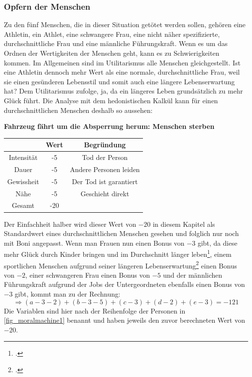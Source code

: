\documentclass[a4paper, 12pt, openany]{book}
\begin{document}
                \subsubsection*{Opfern der Menschen}
                    Zu den fünf Menschen, die in dieser Situation getötet werden sollen, gehören eine Athletin, ein Athlet, eine schwangere Frau, eine nicht näher spezifizierte, durchschnittliche Frau und eine männliche Führungskraft. Wenn es um das Ordnen der Wertigkeiten der Menschen geht, kann es zu Schwierigkeiten kommen. Im Allgemeinen sind im Utilitarismus alle Menschen gleichgestellt. Ist eine Athletin dennoch mehr Wert als eine normale, durchschnittliche Frau, weil sie einen gesünderen Lebensstil und somit auch eine längere Lebenserwartung hat? Dem Utilitarismus zufolge, ja, da ein längeres Leben grundsätzlich zu mehr Glück führt. Die Analyse mit dem hedonistischen Kalkül kann für einen durchschnittlichen Menschen deshalb so aussehen:
                    \begin{center}
                        \textbf{Fahrzeug fährt um die Absperrung herum: Menschen sterben}
                    \end{center}
                    \begin{center}
                        \begin{tabular}{|c|c|c|}
                            \hline
                            & Wert & Begründung \\
                            \hline
                            Intensität & -5 & Tod der Person \\
                            Dauer & -5 & Andere Personen leiden \\
                            Gewissheit & -5 & Der Tod ist garantiert \\
                            Nähe & -5 & Geschieht direkt \\
                            \hline
                            Gesamt & -20 & \\
                            \hline
                        \end{tabular}
                    \end{center}\par
                    \vspace{.3cm}
                    Der Einfachheit halber wird dieser Wert von $-20$ in diesem Kapitel als Standardwert eines durchschnittlichen Menschen gesehen und folglich nur noch mit Boni angepasst. Wenn man Frauen nun einen Bonus von $-3$ gibt, da diese mehr Glück durch Kinder bringen und im Durchschnitt länger leben\footcite[3]{lampert2014soziale}, einem sportlichen Menschen aufgrund seiner längeren Lebenserwartung\footcite[70]{gola2005adipositas} einen Bonus von $-2$, einer schwangeren Frau einen Bonus von $-5$ und der männlichen Führungskraft aufgrund der Jobs der Untergeordneten ebenfalls einen Bonus von $-3$ gibt, kommt man zu der Rechnung:
                    $$\Rightarrow (a - 3 - 2) + (b - 3 - 5) + (c - 3) + (d - 2) + (e - 3) = -121$$
                    Die Variablen sind hier nach der Reihenfolge der Personen in \autoref{fig_moralmachine1} benannt und haben jeweils den zuvor berechneten Wert von $-20$.
                
\end{document}
